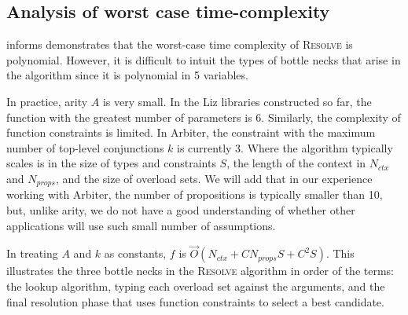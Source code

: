 \subsection{Analysis of worst case time-complexity}

 informs demonstrates that the worst-case time complexity of \textsc{Resolve} is polynomial. However, it is difficult to intuit the types of bottle necks that arise in the algorithm since it is polynomial in 5 variables.

In practice, arity $A$ is very small. In the Liz libraries constructed so far, the function with the greatest number of parameters is 6. Similarly, the complexity of function constraints is limited. In Arbiter, the constraint with the maximum number of top-level conjunctions $k$ is currently 3. Where the algorithm typically scales is in the size of types and constraints $S$, the length of the context in $N_{ctx}$ and $N_{props}$, and the size of overload sets. We will add that in our experience working with Arbiter, the number of propositions is typically smaller than 10, but, unlike arity, we do not have a good understanding of whether other applications will use such small number of assumptions.

In treating $A$ and $k$ as constants, $f$ is $\vec{O}(N_{ctx} + C N_{props} S + C^2 S)$. This illustrates the three bottle necks in the \textsc{Resolve} algorithm in order of the terms: the lookup algorithm, typing each overload set against the arguments, and the final resolution phase that uses function constraints to select a best candidate.
